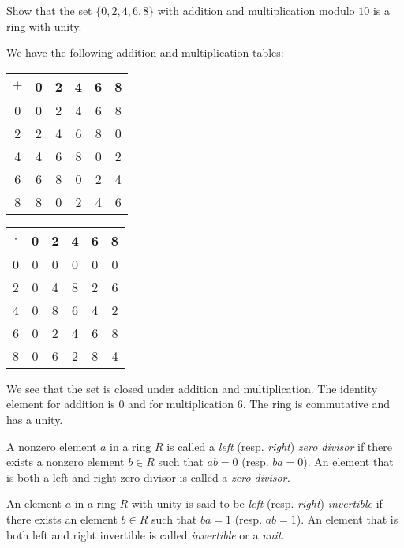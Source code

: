 \begin{example}
    Show that the set \(\{0, 2, 4, 6, 8\}\) with addition and multiplication modulo \(10\) is a ring with unity.

    \begin{solution}
        We have the following addition and multiplication tables:
        \begin{center}
            \begin{tabular}{c|ccccc}
                \(+\) & 0 & 2 & 4 & 6 & 8 \\
                \hline
                0 & 0 & 2 & 4 & 6 & 8 \\
                2 & 2 & 4 & 6 & 8 & 0 \\
                4 & 4 & 6 & 8 & 0 & 2 \\
                6 & 6 & 8 & 0 & 2 & 4 \\
                8 & 8 & 0 & 2 & 4 & 6
            \end{tabular}
            \quad
            \begin{tabular}{c|ccccc}
                \(\cdot\) & 0 & 2 & 4 & 6 & 8 \\
                \hline
                0 & 0 & 0 & 0 & 0 & 0 \\
                2 & 0 & 4 & 8 & 2 & 6 \\
                4 & 0 & 8 & 6 & 4 & 2 \\
                6 & 0 & 2 & 4 & 6 & 8 \\
                8 & 0 & 6 & 2 & 8 & 4
            \end{tabular}
        \end{center}

        We see that the set is closed under addition and multiplication. The identity element for addition is \(0\) and for multiplication \(6\). The ring is commutative and has a unity.
    \end{solution}
\end{example}

\begin{definition}
    A nonzero element \(a\) in a ring \(R\) is called a \emph{left} (resp. \emph{right}) \emph{zero divisor }if there exists a nonzero element \(b \in R\) such that \(ab = 0\) (resp. \(ba = 0\)). An element that is both a left and right zero divisor is called a \emph{zero divisor.}
\end{definition}

\begin{definition}
    An element \(a\) in a ring \(R\) with unity is said to be \emph{left} (resp. \emph{right}) \emph{invertible} if there exists an element \(b \in R\) such that \(ba = 1\) (resp. \(ab = 1\)). An element that is both left and right invertible is called \emph{invertible} or a \emph{unit.}
\end{definition}


